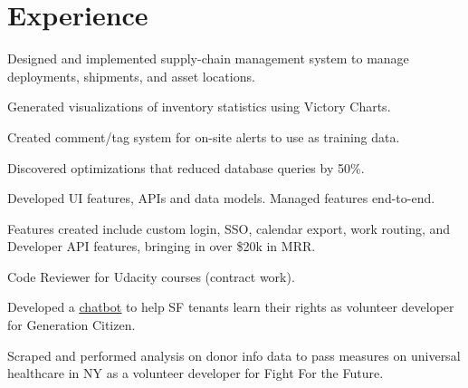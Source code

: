 \documentclass[]{deedy-resume-openfont}
\begin{document}
\begin{minipage}[t]{0.66\textwidth}


\section{Experience}

\vspace{\topsep}
\begin{tightemize}

\item Designed and implemented supply-chain management system to manage deployments, shipments, and asset locations.
\item Generated visualizations of inventory statistics using Victory Charts.
\item Created comment/tag system for on-site alerts to use as training data.
\item Discovered optimizations that reduced database queries by 50\%.

\end{tightemize}
\sectionsep

\begin{tightemize}

\item Developed UI features, APIs and data models. Managed features end-to-end.
\item Features created include custom login, SSO, calendar export, work routing, and Developer API features, bringing in over \$20k in MRR.

\end{tightemize}
\sectionsep

\begin{tightemize}

\item Code Reviewer for Udacity courses (contract work).
\item Developed a \color{blue}\underline{\href{https://github.com/rahul-nath/rentbot}{\color{blue}chatbot}} to help SF tenants learn their rights as volunteer developer for Generation Citizen.
\item Scraped and performed analysis on donor info data to pass measures on universal healthcare in NY as a volunteer developer for Fight For the Future.
\end{tightemize}
\sectionsep


\end{minipage}
\end{document}
